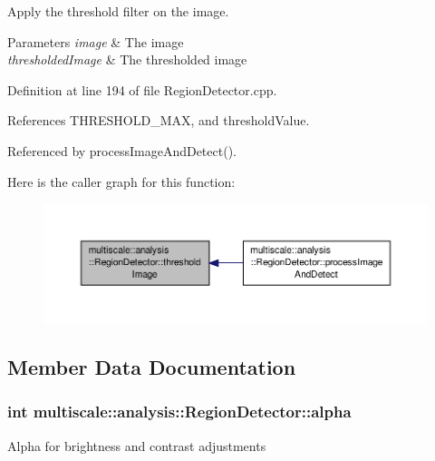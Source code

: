 Apply the threshold filter on the image. 


\begin{DoxyParams}{Parameters}
{\em image} & The image \\
\hline
{\em thresholded\-Image} & The thresholded image \\
\hline
\end{DoxyParams}


Definition at line 194 of file Region\-Detector.\-cpp.



References T\-H\-R\-E\-S\-H\-O\-L\-D\-\_\-\-M\-A\-X, and threshold\-Value.



Referenced by process\-Image\-And\-Detect().



Here is the caller graph for this function\-:\nopagebreak
\begin{figure}[H]
\begin{center}
\leavevmode
\includegraphics[width=350pt]{classmultiscale_1_1analysis_1_1RegionDetector_a614cd80fac5d3df2a25c401bb221149c_icgraph}
\end{center}
\end{figure}




\subsection{Member Data Documentation}
\hypertarget{classmultiscale_1_1analysis_1_1RegionDetector_ab768a3bbfff9835b441a889ab2cb05a6}{
\subsubsection[{alpha}]{\setlength{\rightskip}{0pt plus 5cm}int multiscale\-::analysis\-::\-Region\-Detector\-::alpha\hspace{0.3cm}{\ttfamily [private]}}}\label{classmultiscale_1_1analysis_1_1RegionDetector_ab768a3bbfff9835b441a889ab2cb05a6}
Alpha for brightness and contrast adjustments 

